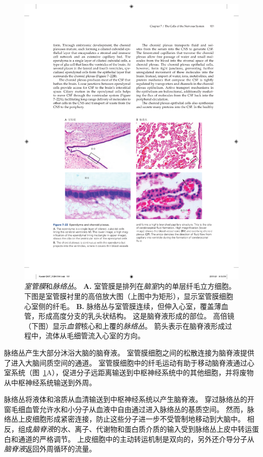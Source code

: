 \begin{figure}[htbp]
	\centering
	\includegraphics[width=1.0\linewidth]{chap07/fig_7_22}
	\caption{\textit{室管膜}和\textit{脉络丛}。
		\textbf{A.} 室管膜是排列在\textit{脑室}内的单层纤毛立方细胞。
		下图是室管膜衬里的高倍放大图（上图中为矩形），显示室管膜细胞心室侧的纤毛。
		\textbf{B.} 脉络丛与室管膜连续，但伸入心室，覆盖薄血管，形成高度分支的乳头状结构。
		这是脑脊液形成的部位。
		高倍镜（下图）显示\textit{血管}核心和上覆的\textit{脉络丛}。
		箭头表示在脑脊液形成过程中，流体从毛细管流入心室的方向。}
	\label{fig:7_22}
\end{figure}


脉络丛产生大部分沐浴大脑的脑脊液。
室管膜细胞之间的松散连接为脑脊液提供了进入大脑间质空间的通道。
室管膜细胞中的纤毛运动有助于移动脑脊液通过心室系统（图~\ref{fig:7_22}A），促进分子远距离输送到中枢神经系统中的其他细胞，并将废物从中枢神经系统输送到外周。


脉络丛将液体和溶质从血清输送到中枢神经系统以产生脑脊液。
穿过脉络丛的开窗毛细血管允许水和小分子从血液中自由通过进入脉络丛的基质空间。
然而，脉络丛上皮细胞形成紧密连接，防止这些分子进一步不受管制地移动到大脑中。
相反，组成\textit{脑脊液}的水、离子、代谢物和蛋白质介质的输入受到脉络丛上皮中转运蛋白和通道的严格调节。
上皮细胞中的主动转运机制是双向的，另外还介导分子从\textit{脑脊液}返回外周循环的流量。


